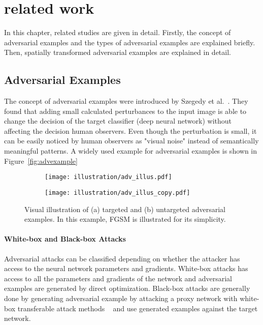 \chapter{related work}
\label{chp:2_literature}

In this chapter, related studies are given in detail. Firstly, the concept of adversarial examples and the types of adversarial examples are explained briefly. Then, spatially transformed adversarial examples are explained in detail.
\section{Adversarial Examples}

The concept of adversarial examples were introduced by Szegedy et al.~\cite{szegedy2013intriguing}. They found that adding small calculated perturbances to the input image is able to change the decision of the target classifier (deep neural network) without affecting the decision human observers. Even though the perturbation is small, it can be easily noticed by human observers as "visual noise" instead of semantically meaningful patterns. A widely used example for adversarial examples is shown in Figure~\ref{fig:advexample}

\begin{figure}[h]
    \centering
    \begin{subfigure}{\linewidth}
        \texttt{[image: illustration/adv\_illus.pdf]}
        \caption{}
    \end{subfigure}
    \begin{subfigure}{\linewidth}
        \texttt{[image: illustration/adv\_illus\_copy.pdf]}
        \caption{}
    \end{subfigure}
    \caption[Visual illustration of adversarial examples. ]{Visual illustration of (a) targeted and (b) untargeted adversarial examples. In this example, FGSM is illustrated for its simplicity.}
\end{figure}


\subsubsection*{White-box and Black-box Attacks}
Adversarial attacks can be classified depending on whether the attacker has access to the neural network parameters and gradients. White-box attacks has access to all the parameters and gradients of the network and adversarial examples are generated by direct optimization. Black-box attacks are generally done by generating adversarial example by attacking a proxy network with white-box transferable attack methods ~\cite{tramer2017space} and use generated examples against the target network.

